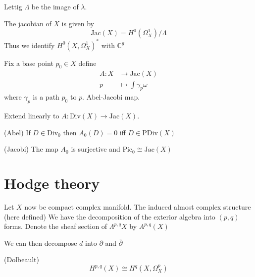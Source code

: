 Lettig $ \Lambda$ be the image of $\lambda$.

\begin{definition}
The jacobian of $ X$ is given by 
    \begin{equation}
        \mathrm{Jac}(X) = H^0 (\Omega^1 _X )/ \Lambda
    \end{equation}
    Thus we identify $H^0 ( X, \Omega^1 _X) ^* $ with $ \mathbb{C} ^ g$
\end{definition}

\begin{definition}
    Fix a base point $ p_0 \in X $ define 
    \begin{align}
        A: X & \rightarrow \mathrm{Jac}(X) \\
        p & \mapsto \int \gamma_p \omega 
    \end{align}
    where $ \gamma_p $ is a path $p_0 $ to $p $. 
    Abel-Jacobi map.

    Extend linearly to $ A : \mathrm{Div}(X) \rightarrow \mathrm{Jac} (X) $.
\end{definition}

\begin{theorem}
    (Abel) If $D \in \mathrm{Div}_0 $ then $A_0 (D) = 0 $ iff $D \in \mathrm{PDiv}(X)$
\end{theorem}

\begin{theorem}
    (Jacobi) The map $A_0 $ is surjective and $\mathrm{Pic} _0 \cong \mathrm{Jac}(X)$ 
\end{theorem}


\section{Hodge theory } %

Let $X$ now be compact complex manifold. 
The induced almost complex structure (here defined) 
We have the decomposition of the exterior algebra into $(p,q)$ forms. 
Denote the sheaf section of $ \Lambda^{p,q} X$ by $ A^{p,q} (X) $ 

We can then decompose $ d$ into $ \partial$ and $ \bar{\partial} $ 

\begin{theorem}
    (Dolbeault) 
    \begin{equation}
        H^{p,q} ( X) \cong H^q ( X, \Omega ^p _X ) 
    \end{equation}
\end{theorem}

